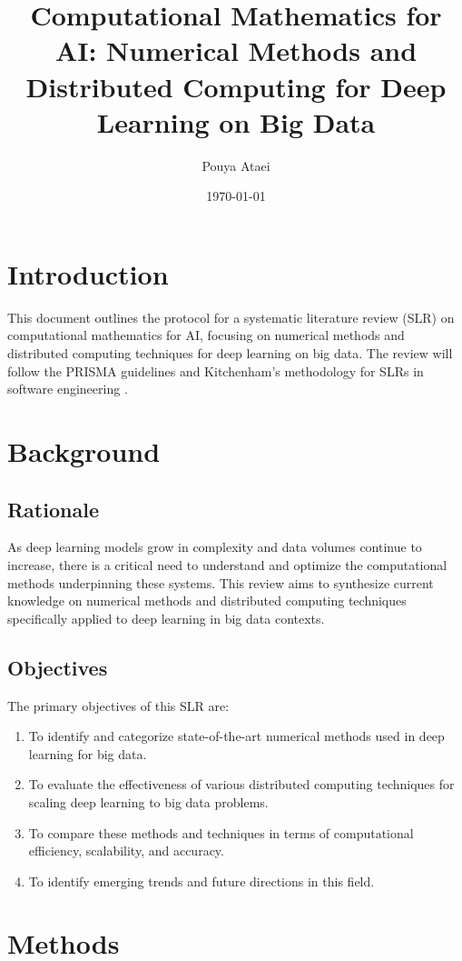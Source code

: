 \documentclass[a4paper,12pt]{article}
\title{Computational Mathematics for AI: Numerical Methods and Distributed Computing for Deep Learning on Big Data}
\author{Pouya Ataei}
\date{\today}
\begin{document}
\maketitle

\section{Introduction}
This document outlines the protocol for a systematic literature review (SLR) on computational mathematics for AI, focusing on numerical methods and distributed computing techniques for deep learning on big data. The review will follow the PRISMA guidelines \citep{moher2009preferred} and Kitchenham's methodology for SLRs in software engineering \citep{kitchenham2007guidelines}.

\section{Background}
\subsection{Rationale}
As deep learning models grow in complexity and data volumes continue to increase, there is a critical need to understand and optimize the computational methods underpinning these systems. This review aims to synthesize current knowledge on numerical methods and distributed computing techniques specifically applied to deep learning in big data contexts.

\subsection{Objectives}
The primary objectives of this SLR are:
\begin{enumerate}
    \item To identify and categorize state-of-the-art numerical methods used in deep learning for big data.
    \item To evaluate the effectiveness of various distributed computing techniques for scaling deep learning to big data problems.
    \item To compare these methods and techniques in terms of computational efficiency, scalability, and accuracy.
    \item To identify emerging trends and future directions in this field.
\end{enumerate}

\section{Methods}
\end{document}
